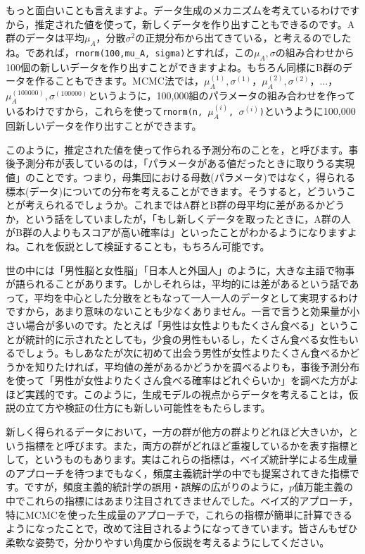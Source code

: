 \documentclass{ltjbook}
\begin{document}
もっと面白いことも言えますよ。データ生成のメカニズムを考えているわけですから，推定された値を使って，新しくデータを作り出すこともできるのです。A群のデータは平均$\mu_A$，分散$\sigma^2$の正規分布から出てきている，と考えるのでしたね。であれば，\verb|rnorm(100,mu_A, sigma)|とすれば，この$\mu_A,\sigma$の組み合わせから100個の新しいデータを作り出すことができますよね。もちろん同様にB群のデータを作ることもできます。MCMC法では，$\mu_A^{(1)},\sigma^{(1)}$，$\mu_A^{(2)},\sigma^{(2)}$，...，$\mu_A^{(100000)},\sigma^{(100000)}$というように，100,000組のパラメータの組み合わせを作っているわけですから，これらを使って\verb|rnorm(n, |$\mu_A^{(i)}$\verb|, |$\sigma^{(i)}$\verb|)|というように100,000回新しいデータを作り出すことができます。

このように，推定された値を使って作られる予測分布のことを，と呼びます。事後予測分布が表しているのは，「パラメータがある値だったときに取りうる実現値」のことです。つまり，母集団における母数(パラメータ)ではなく，得られる標本(データ)についての分布を考えることができます。そうすると，どういうことが考えられるでしょうか。これまではA群とB群の母平均に差があるかどうか，という話をしていましたが，「もし新しくデータを取ったときに，A群の人がB群の人よりもスコアが高い確率は」といったことがわかるようになりますよね。これを仮説として検証することも，もちろん可能です。

世の中には「男性脳と女性脳」「日本人と外国人」のように，大きな主語で物事が語られることがあります。しかしそれらは，平均的には差があるという話であって，平均を中心とした分散をともなって一人一人のデータとして実現するわけですから，あまり意味のないことも少なくありません。一言で言うと効果量が小さい場合が多いのです。たとえば「男性は女性よりもたくさん食べる」ということが統計的に示されたとしても，少食の男性もいるし，たくさん食べる女性もいるでしょう。もしあなたが次に初めて出会う男性が女性よりたくさん食べるかどうかを知りたければ，平均値の差があるかどうかを調べるよりも，事後予測分布を使って「男性が女性よりたくさん食べる確率はどれぐらいか」を調べた方がよほど実践的です。このように，生成モデルの視点からデータを考えることは，仮説の立て方や検証の仕方にも新しい可能性をもたらします。

新しく得られるデータにおいて，一方の群が他方の群よりどれほど大きいか，という指標をと呼びます。また，両方の群がどれほど重複しているかを表す指標として，というものもあります。実はこれらの指標は，ベイズ統計学による生成量のアプローチを待つまでもなく，頻度主義統計学の中でも提案されてきた指標です。ですが，頻度主義的統計学の誤用・誤解の広がりのように，$p$値万能主義の中でこれらの指標にはあまり注目されてきませんでした。ベイズ的アプローチ，特にMCMCを使った生成量のアプローチで，これらの指標が簡単に計算できるようになったことで，改めて注目されるようになってきています。皆さんもぜひ柔軟な姿勢で，分かりやすい角度から仮説を考えるようにしてください。
\end{document}
